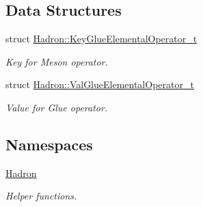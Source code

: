 \subsection*{Data Structures}
\begin{DoxyCompactItemize}
\item 
struct \mbox{\hyperlink{structHadron_1_1KeyGlueElementalOperator__t}{Hadron\+::\+Key\+Glue\+Elemental\+Operator\+\_\+t}}
\begin{DoxyCompactList}\small\item\em Key for Meson operator. \end{DoxyCompactList}\item 
struct \mbox{\hyperlink{structHadron_1_1ValGlueElementalOperator__t}{Hadron\+::\+Val\+Glue\+Elemental\+Operator\+\_\+t}}
\begin{DoxyCompactList}\small\item\em Value for Glue operator. \end{DoxyCompactList}\end{DoxyCompactItemize}
\subsection*{Namespaces}
\begin{DoxyCompactItemize}
\item 
 \mbox{\hyperlink{namespaceHadron}{Hadron}}
\begin{DoxyCompactList}\small\item\em Helper functions. \end{DoxyCompactList}\end{DoxyCompactItemize}
